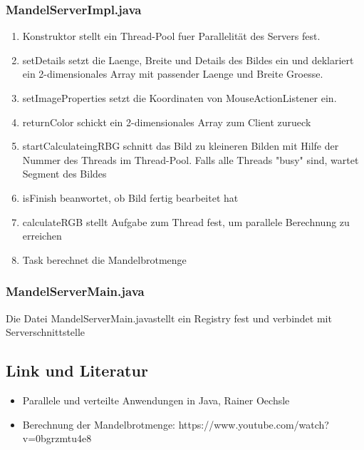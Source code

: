 \documentclass{article}
\begin{document}
	\subsubsection{MandelServerImpl.java}
	\begin{enumerate}
		\item Konstruktor stellt ein Thread-Pool fuer Parallelität des Servers fest.
			
		\item setDetails setzt die Laenge, Breite und Details des Bildes ein und deklariert ein 2-dimensionales Array mit passender Laenge und Breite Groesse. 
			
		\item setImageProperties setzt die Koordinaten von MouseActionListener ein.
			
		\item returnColor schickt ein 2-dimensionales Array zum Client zurueck
			
		\newpage		
		\item startCalculateingRBG schnitt das Bild zu kleineren Bilden mit Hilfe der Nummer des Threads im Thread-Pool. Falls alle Threads "busy" sind, wartet Segment des Bildes 
			
		\item isFinish beanwortet, ob Bild fertig bearbeitet hat
			
		\item calculateRGB stellt Aufgabe zum Thread fest, um parallele Berechnung zu erreichen
			
		\newpage
		\item Task berechnet die Mandelbrotmenge
			
	\end{enumerate}
	
	\subsubsection{MandelServerMain.java}
	Die Datei \glqq MandelServerMain.java\grqq stellt ein Registry fest und verbindet mit Serverschnittstelle
	
	
	\newpage
	\subsection{Link und Literatur}
	\begin{itemize}
		\item Parallele und verteilte Anwendungen in Java, Rainer Oechsle
		\item Berechnung der Mandelbrotmenge: https://www.youtube.com/watch?v=0bgrzmtu4e8
	\end{itemize}
\end{document}
